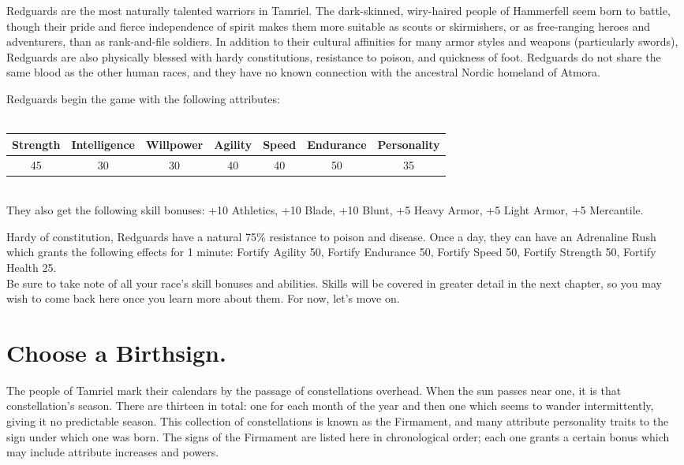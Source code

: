 \documentclass[12pt]{book}
\begin{document}
Redguards are the most naturally talented warriors in Tamriel. The dark-skinned, wiry-haired people of Hammerfell seem born to battle, though their pride and fierce independence of spirit makes them more suitable as scouts or skirmishers, or as free-ranging heroes and adventurers, than as rank-and-file soldiers. In addition to their cultural affinities for many armor styles and weapons (particularly swords), Redguards are also physically blessed with hardy constitutions, resistance to poison, and quickness of foot. Redguards do not share the same blood as the other human races, and they have no known connection with the ancestral Nordic homeland of Atmora.

Redguards begin the game with the following attributes:\\~\\
\begin{tabular}{|c|c|c|c|c|c|c|}
\hline
Strength & Intelligence & Willpower & Agility & Speed & Endurance & Personality\\ \hline
45 & 30 & 30 & 40 & 40 & 50 & 35\\ \hline

\end{tabular}\\

They also get the following skill bonuses: +10 Athletics, +10 Blade, +10 Blunt, +5 Heavy Armor, +5 Light Armor, +5 Mercantile.

Hardy of constitution, Redguards have a natural 75\% resistance to poison and disease. Once a day, they can have an Adrenaline Rush which grants the following effects for 1 minute: Fortify Agility 50, Fortify Endurance 50, Fortify Speed 50, Fortify Strength 50, Fortify Health 25.\\

Be sure to take note of all your race's skill bonuses and abilities. Skills will be covered in greater detail in the next chapter, so you may wish to come back here once you learn more about them. For now, let's move on.
\newpage
\section{Choose a Birthsign.}
The people of Tamriel mark their calendars by the passage of constellations overhead. When the sun passes near one, it is that constellation's season. There are thirteen in total: one for each month of the year and then one which seems to wander intermittently, giving it no predictable season. This collection of constellations is known as the Firmament, and many attribute personality traits to the sign under which one was born. The signs of the Firmament are listed here in chronological order; each one grants a certain bonus which may include attribute increases and powers.\\~\\
\end{document}
